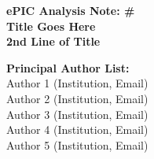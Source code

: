 %
\vspace*{0.1cm}
\begin{center}
{\bf\Large ePIC Analysis Note: \# } \\
\vspace*{1.0cm}
{\bf\Large Title Goes Here} \\
\vspace*{0.5cm}
{\bf\Large 2nd Line of Title} \\
\end{center}
%
\vspace*{1.0cm}
%
\begin{center}
{\bf Principal Author List:} \\ 
\vspace*{0.25cm}
Author 1 (Institution, Email)\\
Author 2 (Institution, Email)\\
Author 3 (Institution, Email)\\
Author 4 (Institution, Email)\\
Author 5 (Institution, Email)\\
\end{center}
%
\date{\today}
%
\pagebreak
%
\begin{abstract}
\noindent Abstract for analysis note goes here.
 \end{abstract}